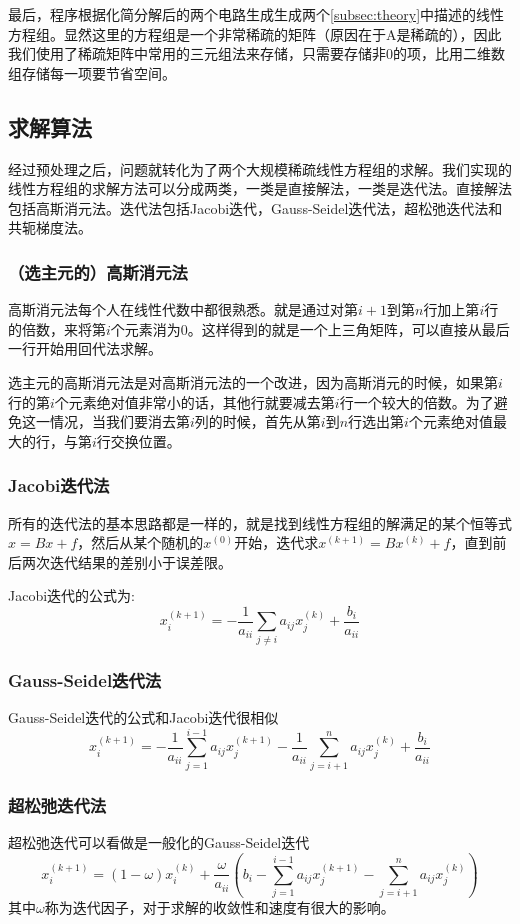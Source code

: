 \documentclass[UTF8,11pt]{report}
\begin{document}
最后，程序根据化简分解后的两个电路生成生成两个\ref{subsec:theory}中描述的线性方程组。显然这里的方程组是一个非常稀疏的矩阵（原因在于A是稀疏的），因此我们使用了稀疏矩阵中常用的三元组法来存储，只需要存储非0的项，比用二维数组存储每一项要节省空间。
\subsection{求解算法}
经过预处理之后，问题就转化为了两个大规模稀疏线性方程组的求解。我们实现的线性方程组的求解方法可以分成两类，一类是直接解法，一类是迭代法。直接解法包括高斯消元法。迭代法包括Jacobi迭代，Gauss-Seidel迭代法，超松弛迭代法和共轭梯度法。
\subsubsection{（选主元的）高斯消元法}
高斯消元法每个人在线性代数中都很熟悉。就是通过对第$i+1$到第$n$行加上第$i$行的倍数，来将第$i$个元素消为0。这样得到的就是一个上三角矩阵，可以直接从最后一行开始用回代法求解。

选主元的高斯消元法是对高斯消元法的一个改进，因为高斯消元的时候，如果第$i$行的第$i$个元素绝对值非常小的话，其他行就要减去第$i$行一个较大的倍数。为了避免这一情况，当我们要消去第$i$列的时候，首先从第$i$到$n$行选出第$i$个元素绝对值最大的行，与第$i$行交换位置。
\subsubsection{Jacobi迭代法}
所有的迭代法的基本思路都是一样的，就是找到线性方程组的解满足的某个恒等式$x=Bx+f$，然后从某个随机的$x^{(0)}$开始，迭代求$x^{(k+1)}=Bx^{(k)}+f$，直到前后两次迭代结果的差别小于误差限。

Jacobi迭代的公式为:
\begin{equation}
	x_i^{(k+1)}=-\frac{1}{a_{ii}}\sum_{j\neq i}{a_{ij}}x_j^{(k)}+\frac{b_i}{a_{ii}}
\end{equation}
\subsubsection{Gauss-Seidel迭代法}
Gauss-Seidel迭代的公式和Jacobi迭代很相似
\begin{equation}
	x_i^{(k+1)}=-\frac{1}{a_{ii}}\sum_{j=1}^{i-1}{a_{ij}}x_j^{(k+1)}-\frac{1}{a_{ii}}\sum_{j=i+1}^{n}{a_{ij}}x_j^{(k)}+\frac{b_i}{a_{ii}}
\end{equation}
\subsubsection{超松弛迭代法}
超松弛迭代可以看做是一般化的Gauss-Seidel迭代
\begin{equation}
	x_i^{(k+1)}=(1-\omega)x_i^{(k)}+\frac{\omega}{a_{ii}}(b_i-\sum_{j=1}^{i-1}{a_{ij}}x_j^{(k+1)}-\sum_{j=i+1}^{n}{a_{ij}}x_j^{(k)})	
\end{equation}
其中$\omega$称为迭代因子，对于求解的收敛性和速度有很大的影响。
\end{document}
